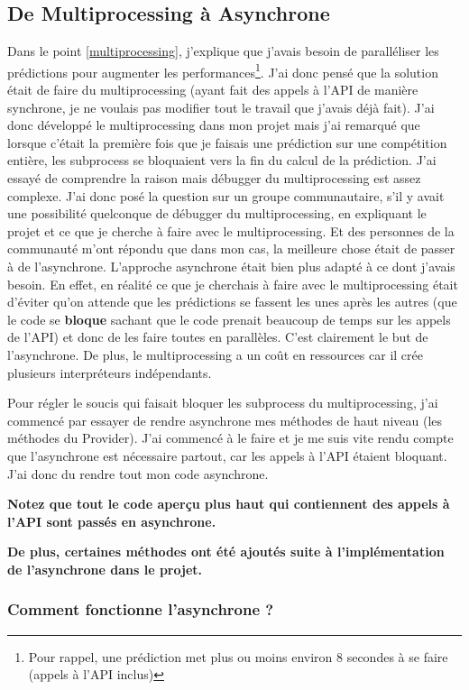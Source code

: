 \documentclass[a4paper,14pt]{extarticle}
\begin{document}
{\subsection{De Multiprocessing à Asynchrone}
Dans le point \ref{multiprocessing}, j'explique que j'avais besoin de paralléliser les prédictions pour augmenter les performances\footnote{Pour rappel, une prédiction met plus ou moins environ 8 secondes à se faire (appels à l'API inclus) }. J'ai donc pensé que la solution était de faire du multiprocessing (ayant fait des appels à l'API de manière synchrone, je ne voulais pas modifier tout le travail que j'avais déjà fait). J'ai donc développé le multiprocessing dans mon projet mais j'ai remarqué que lorsque c'était la première fois que je faisais une prédiction sur une compétition entière, les subprocess se bloquaient vers la fin du calcul de la prédiction. J'ai essayé de comprendre la raison mais débugger du multiprocessing est assez complexe. J'ai donc posé la question sur un groupe communautaire, s'il y avait une possibilité quelconque de débugger du multiprocessing, en expliquant le projet et ce que je cherche à faire avec le multiprocessing. Et des personnes de la communauté m'ont répondu que dans mon cas, la meilleure chose était de passer à de l'asynchrone. L'approche asynchrone était bien plus adapté à ce dont j'avais besoin. En effet, en réalité ce que je cherchais à faire avec le multiprocessing était d'éviter qu'on attende que les prédictions se fassent les unes après les autres (que le code se \textbf{bloque} sachant que le code prenait beaucoup de temps sur les appels de l'API) et donc de les faire toutes en parallèles. C'est clairement le but de l'asynchrone. De plus, le multiprocessing a un coût en ressources car il crée plusieurs interpréteurs indépendants.

Pour régler le soucis qui faisait bloquer les subprocess du multiprocessing, j'ai commencé par essayer de rendre asynchrone mes méthodes de haut niveau (les méthodes du Provider). J'ai commencé à le faire et je me suis vite rendu compte que l'asynchrone est nécessaire partout, car les appels à l'API étaient bloquant. J'ai donc du rendre tout mon code asynchrone. 

\textbf{Notez que tout le code aperçu plus haut qui contiennent des appels à l'API sont passés en asynchrone.}

\textbf{De plus, certaines méthodes ont été ajoutés suite à l'implémentation de l'asynchrone dans le projet.}

\subsubsection{Comment fonctionne l'asynchrone ?}

}
\end{document}
